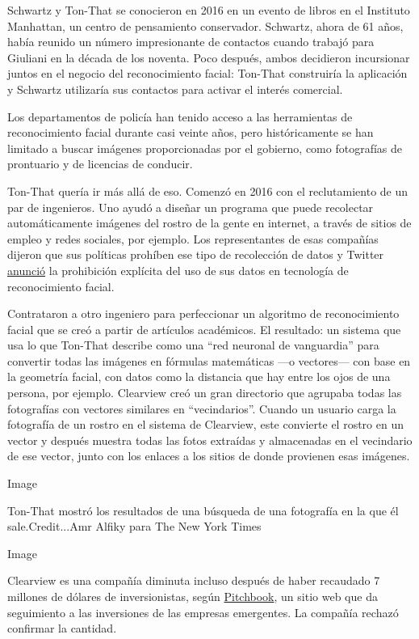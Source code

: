 Schwartz y Ton-That se conocieron en 2016 en un evento de libros en el
Instituto Manhattan, un centro de pensamiento conservador. Schwartz,
ahora de 61 años, había reunido un número impresionante de contactos
cuando trabajó para Giuliani en la década de los noventa. Poco después,
ambos decidieron incursionar juntos en el negocio del reconocimiento
facial: Ton-That construiría la aplicación y Schwartz utilizaría sus
contactos para activar el interés comercial.

Los departamentos de policía han tenido acceso a las herramientas de
reconocimiento facial durante casi veinte años, pero históricamente se
han limitado a buscar imágenes proporcionadas por el gobierno, como
fotografías de prontuario y de licencias de conducir.

Ton-That quería ir más allá de eso. Comenzó en 2016 con el reclutamiento
de un par de ingenieros. Uno ayudó a diseñar un programa que puede
recolectar automáticamente imágenes del rostro de la gente en internet,
a través de sitios de empleo y redes sociales, por ejemplo. Los
representantes de esas compañías dijeron que sus políticas prohíben ese
tipo de recolección de datos y Twitter
\href{https://developer.twitter.com/en/developer-terms/more-on-restricted-use-cases}{anunció}
la prohibición explícita del uso de sus datos en tecnología de
reconocimiento facial.

Contrataron a otro ingeniero para perfeccionar un algoritmo de
reconocimiento facial que se creó a partir de artículos académicos. El
resultado: un sistema que usa lo que Ton-That describe como una ``red
neuronal de vanguardia'' para convertir todas las imágenes en fórmulas
matemáticas ---o vectores--- con base en la geometría facial, con datos
como la distancia que hay entre los ojos de una persona, por ejemplo.
Clearview creó un gran directorio que agrupaba todas las fotografías con
vectores similares en ``vecindarios''. Cuando un usuario carga la
fotografía de un rostro en el sistema de Clearview, este convierte el
rostro en un vector y después muestra todas las fotos extraídas y
almacenadas en el vecindario de ese vector, junto con los enlaces a los
sitios de donde provienen esas imágenes.

Image

Ton-That mostró los resultados de una búsqueda de una fotografía en la
que él sale.Credit...Amr Alfiky para The New York Times

Image

Clearview es una compañía diminuta incluso después de haber recaudado 7
millones de dólares de inversionistas, según
\href{https://pitchbook.com/profiles/company/232177-96}{Pitchbook}, un
sitio web que da seguimiento a las inversiones de las empresas
emergentes. La compañía rechazó confirmar la cantidad.

